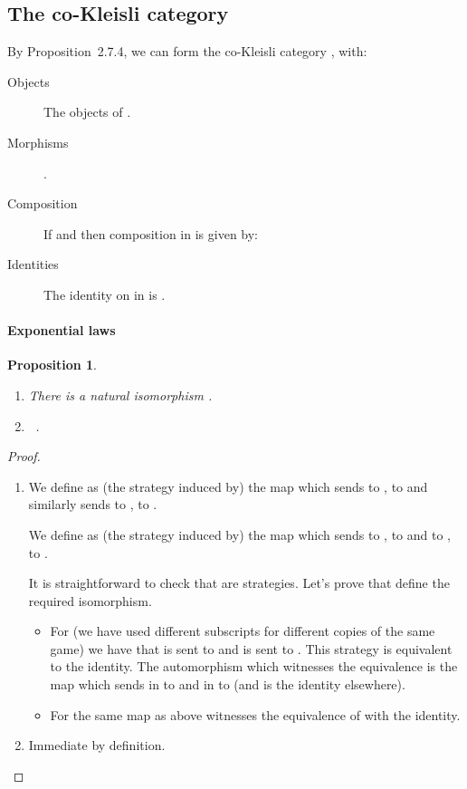 \documentclass[11pt]{article}
\newtheorem{proposition}[theorem]{Proposition}
\begin{document}
\subsection{The co-Kleisli category}
By Proposition~2.7.4, we can form the co-Kleisli category , with:
\begin{description}
\item[Objects] The objects of .
\item[Morphisms] .
\item[Composition] If  and 
then composition in  is given by:

\item[Identities] The identity on  in  is
.
\end{description}

\paragraph{Exponential laws}
\begin{proposition}
\begin{enumerate}
\item There is a natural isomorphism
.
\item \, .
\end{enumerate}
\end{proposition}
\begin{proof}
\begin{enumerate}
\item We define  as
  (the strategy induced by) the
map which sends  to
,  to
 and similarly sends  to ,  to  .

We define  as
(the strategy induced by) the map
which sends  to ,   to  and  to  ,  to .

It is straightforward to check that  are strategies.
Let's prove that  define the required isomorphism.

\begin{itemize}
\item For  (we have used different subscripts for different copies of
the same game) we have that  is sent to
 and  is
sent to  . This strategy is
equivalent to the
identity. The automorphism which witnesses the equivalence is the map
which sends  in  to  and  in  to  (and is
the identity elsewhere).

\item For  the same map as above witnesses the
equivalence of  with the identity.
\end{itemize}
\item Immediate by definition.

\end{enumerate}
\end{proof}
\end{document}
